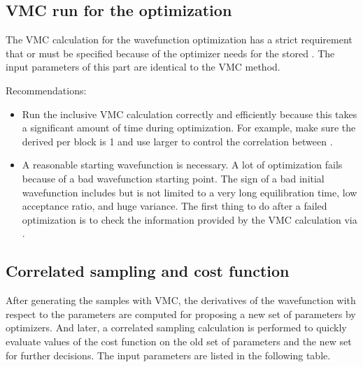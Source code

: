 \documentclass[letterpaper,10pt,english]{sphinxmanual}
\begin{document}
\subsection{VMC run for the optimization}
\label{\detokenize{methods:vmc-run-for-the-optimization}}
The VMC calculation for the wavefunction optimization has a strict requirement
that  or  must be specified because of the optimizer needs for the stored .
The input parameters of this part are identical to the VMC method.

Recommendations:
\begin{itemize}
\item {} 
Run the inclusive VMC calculation correctly and efficiently because
this takes a significant amount of time during optimization. For
example, make sure the derived  per block is 1 and use larger  to
control the correlation between .

\item {} 
A reasonable starting wavefunction is necessary. A lot of
optimization fails because of a bad wavefunction starting point. The
sign of a bad initial wavefunction includes but is not limited to a
very long equilibration time, low acceptance ratio, and huge
variance. The first thing to do after a failed optimization is to
check the information provided by the VMC calculation via
.

\end{itemize}


\subsection{Correlated sampling and cost function}
\label{\detokenize{methods:correlated-sampling-and-cost-function}}
After generating the samples with VMC, the derivatives of the wavefunction with respect to the parameters are computed for proposing a new set of parameters by optimizers.
And later, a correlated sampling calculation is performed to quickly evaluate values of the cost function on the old set of parameters and the new set for further decisions.
The input parameters are listed in the following table.
\end{document}
